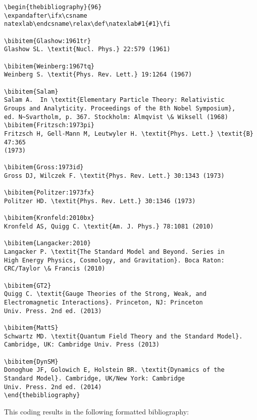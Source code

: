 \begin{verbatim}
\begin{thebibliography}{96}
\expandafter\ifx\csname
natexlab\endcsname\relax\def\natexlab#1{#1}\fi

\bibitem{Glashow:1961tr}
Glashow SL. \textit{Nucl. Phys.} 22:579 (1961)

\bibitem{Weinberg:1967tq}
Weinberg S. \textit{Phys. Rev. Lett.} 19:1264 (1967)

\bibitem{Salam}
Salam A.  In \textit{Elementary Particle Theory: Relativistic
Groups and Analyticity. Proceedings of the 8th Nobel Symposium},
ed. N~Svartholm, p. 367. Stockholm: Almqvist \& Wiksell (1968)
\bibitem{Fritzsch:1973pi}
Fritzsch H, Gell-Mann M, Leutwyler H. \textit{Phys. Lett.} \textit{B} 47:365
(1973)

\bibitem{Gross:1973id}
Gross DJ, Wilczek F. \textit{Phys. Rev. Lett.} 30:1343 (1973)

\bibitem{Politzer:1973fx}
Politzer HD. \textit{Phys. Rev. Lett.} 30:1346 (1973)

\bibitem{Kronfeld:2010bx}
Kronfeld AS, Quigg C. \textit{Am. J. Phys.} 78:1081 (2010)

\bibitem{Langacker:2010}
Langacker P. \textit{The Standard Model and Beyond. Series in
High Energy Physics, Cosmology, and Gravitation}. Boca Raton:
CRC/Taylor \& Francis (2010)

\bibitem{GT2}
Quigg C. \textit{Gauge Theories of the Strong, Weak, and
Electromagnetic Interactions}. Princeton, NJ: Princeton
Univ. Press. 2nd ed. (2013)

\bibitem{MattS}
Schwartz MD. \textit{Quantum Field Theory and the Standard Model}.
Cambridge, UK: Cambridge Univ. Press (2013)

\bibitem{DynSM}
Donoghue JF, Golowich E, Holstein BR. \textit{Dynamics of the
Standard Model}. Cambridge, UK/New York: Cambridge
Univ. Press. 2nd ed. (2014)
\end{thebibliography}
\end{verbatim}

This coding results in the following formatted bibliography:

